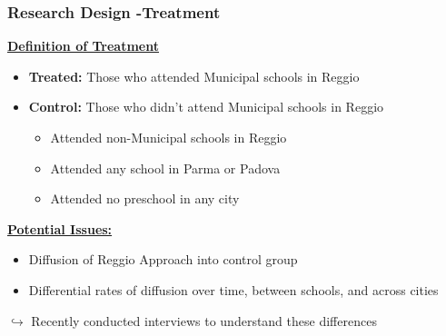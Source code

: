 \begin{frame}
\frametitle{Research Design -Treatment} 
\underline{\textbf{Definition of Treatment}}
\begin{itemize}
	\item \textbf{Treated:} Those who attended Municipal schools in Reggio
	\smallskip
	\item \textbf{Control:} Those who didn't attend Municipal schools in Reggio
	\begin{itemize}
		\item Attended non-Municipal schools in Reggio
		\item Attended any school in Parma or Padova
		\item Attended no preschool in any city
	\end{itemize}
\end{itemize}
\bigskip
\underline{\textbf{Potential Issues:}}
\begin{itemize}
	\item Diffusion of Reggio Approach into control group
	\item Differential rates of diffusion over time, between schools, and across cities
\end{itemize}
\begin{block}{}
$\mathbf{\hookrightarrow}$ Recently conducted interviews to understand these differences
\end{block}

\end{frame}
